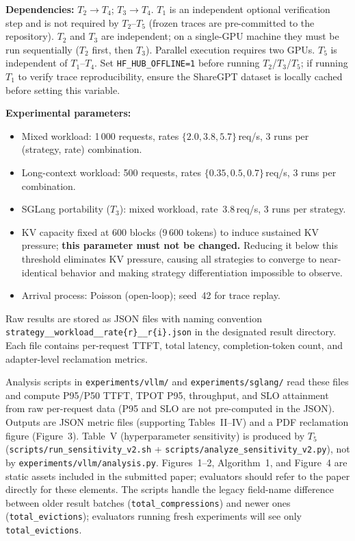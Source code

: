 \documentclass[conference]{IEEEtran}
\begin{document}
\textbf{Dependencies:} $T_2 \rightarrow T_4$; $T_3 \rightarrow T_4$.
$T_1$ is an independent optional verification step and is not required
by $T_2$--$T_5$ (frozen traces are pre-committed to the repository).
$T_2$ and $T_3$ are independent; on a single-GPU machine they must be
run sequentially ($T_2$ first, then $T_3$).
Parallel execution requires two GPUs.
$T_5$ is independent of $T_1$--$T_4$.
Set \texttt{HF\_HUB\_OFFLINE=1} before running $T_2$/$T_3$/$T_5$;
if running $T_1$ to verify trace reproducibility, ensure the
ShareGPT dataset is locally cached before setting this variable.

\textbf{Experimental parameters:}
\begin{itemize}
  \item Mixed workload: 1\,000 requests, rates $\{2.0, 3.8, 5.7\}$\,req/s,
    3 runs per (strategy, rate) combination.
  \item Long-context workload: 500 requests,
    rates $\{0.35, 0.5, 0.7\}$\,req/s, 3 runs per combination.
  \item SGLang portability ($T_3$): mixed workload,
    rate~3.8\,req/s, 3 runs per strategy.
  \item KV capacity fixed at 600 blocks (9\,600 tokens) to induce
    sustained KV pressure; \textbf{this parameter must not be changed.}
    Reducing it below this threshold eliminates KV pressure, causing all
    strategies to converge to near-identical behavior and making strategy
    differentiation impossible to observe.
  \item Arrival process: Poisson (open-loop); seed~42 for trace replay.
\end{itemize}

\artout

Raw results are stored as JSON files with naming convention
\texttt{strategy\_\_workload\_\_rate\{r\}\_\_r\{i\}.json}
in the designated result directory.
Each file contains per-request TTFT, total latency, completion-token count,
and adapter-level reclamation metrics.

Analysis scripts in \texttt{experiments/vllm/} and
\texttt{experiments/sglang/} read these files and compute P95/P50
TTFT, TPOT P95, throughput, and SLO attainment from raw
per-request data (P95 and SLO are not pre-computed in the JSON).
Outputs are JSON metric files (supporting Tables~II--IV) and a PDF
reclamation figure (Figure~3). Table~V (hyperparameter sensitivity)
is produced by $T_5$ (\texttt{scripts/run\_sensitivity\_v2.sh} +
\texttt{scripts/analyze\_sensitivity\_v2.py}), not by
\texttt{experiments/vllm/analysis.py}.
Figures~1--2, Algorithm~1, and Figure~4 are static assets
included in the submitted paper; evaluators should refer to the
paper directly for these elements.
The scripts handle the legacy field-name difference between older
result batches (\texttt{total\_compressions}) and newer ones
(\texttt{total\_evictions});
evaluators running fresh experiments will see only
\texttt{total\_evictions}.
\end{document}
